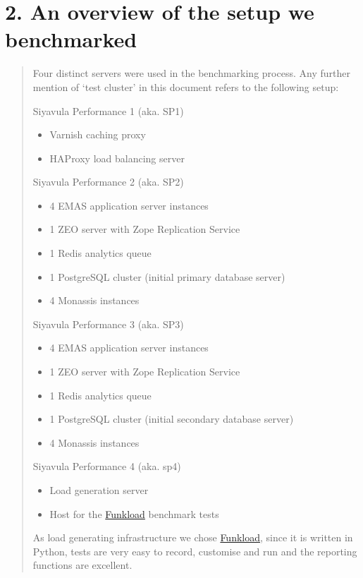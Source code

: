 \documentclass[letterpaper,10pt,english]{sphinxmanual}
\begin{document}
\chapter{2. An overview of the setup we benchmarked}
\label{index:an-overview-of-the-setup-we-benchmarked}\begin{quote}

Four distinct servers were used in the benchmarking process.  Any further
mention of `test cluster' in this document refers to the following setup:

Siyavula Performance 1 (aka. SP1)
\begin{itemize}
\item {} 
Varnish caching proxy

\item {} 
HAProxy load balancing server

\end{itemize}

Siyavula Performance 2 (aka. SP2)
\begin{itemize}
\item {} 
4 EMAS application server instances

\item {} 
1 ZEO server with Zope Replication Service

\item {} 
1 Redis analytics queue

\item {} 
1 PostgreSQL cluster (initial primary database server)

\item {} 
4 Monassis instances

\end{itemize}

Siyavula Performance 3 (aka. SP3)
\begin{itemize}
\item {} 
4 EMAS application server instances

\item {} 
1 ZEO server with Zope Replication Service

\item {} 
1 Redis analytics queue

\item {} 
1 PostgreSQL cluster (initial secondary database server)

\item {} 
4 Monassis instances

\end{itemize}

Siyavula Performance 4 (aka. sp4)
\begin{itemize}
\item {} 
Load generation server

\item {} 
Host for the \href{http://funkload.nuxeo.org}{Funkload} benchmark tests

\end{itemize}

As load generating infrastructure we chose \href{http://funkload.nuxeo.org}{Funkload}, since it is written in
Python, tests are very easy to record, customise and run and the reporting
functions are excellent.
\end{quote}
\end{document}
